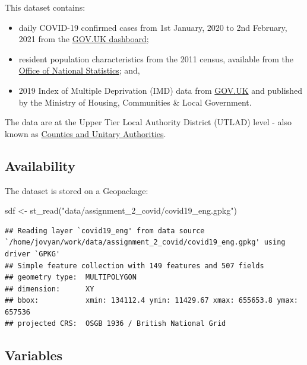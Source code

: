 \documentclass[
]{book}
\newenvironment{Shaded}{\begin{snugshade}}{\end{snugshade}}
\newcommand{\FunctionTok}[1]{\textcolor[rgb]{0.00,0.00,0.00}{#1}}
\newcommand{\NormalTok}[1]{#1}
\newcommand{\OtherTok}[1]{\textcolor[rgb]{0.56,0.35,0.01}{#1}}
\newcommand{\StringTok}[1]{\textcolor[rgb]{0.31,0.60,0.02}{#1}}
\begin{document}
This dataset contains:

\begin{itemize}
\item
  daily COVID-19 confirmed cases from 1st January, 2020 to 2nd February, 2021 from the \href{https://coronavirus.data.gov.uk}{GOV.UK dashboard};
\item
  resident population characteristics from the 2011 census, available from the \href{https://www.nomisweb.co.uk/home/census2001.asp}{Office of National Statistics}; and,
\item
  2019 Index of Multiple Deprivation (IMD) data from \href{https://www.gov.uk/government/statistics/english-indices-of-deprivation-2019}{GOV.UK} and published by the Ministry of Housing, Communities \& Local Government.
\end{itemize}

The data are at the Upper Tier Local Authority District (UTLAD) level - also known as \href{https://geoportal.statistics.gov.uk/datasets/fe6bcee87d95476abc84e194fe088abb_0}{Counties and Unitary Authorities}.

\hypertarget{availability-1}{%
\subsection*{Availability}\label{availability-1}}

The dataset is stored on a Geopackage:

\begin{Shaded}
\begin{Highlighting}[]
\NormalTok{sdf }\OtherTok{\textless{}{-}} \FunctionTok{st\_read}\NormalTok{(}\StringTok{"data/assignment\_2\_covid/covid19\_eng.gpkg"}\NormalTok{)}
\end{Highlighting}
\end{Shaded}

\begin{verbatim}
## Reading layer `covid19_eng' from data source `/home/jovyan/work/data/assignment_2_covid/covid19_eng.gpkg' using driver `GPKG'
## Simple feature collection with 149 features and 507 fields
## geometry type:  MULTIPOLYGON
## dimension:      XY
## bbox:           xmin: 134112.4 ymin: 11429.67 xmax: 655653.8 ymax: 657536
## projected CRS:  OSGB 1936 / British National Grid
\end{verbatim}

\hypertarget{variables-1}{%
\subsection*{Variables}\label{variables-1}}
\end{document}
